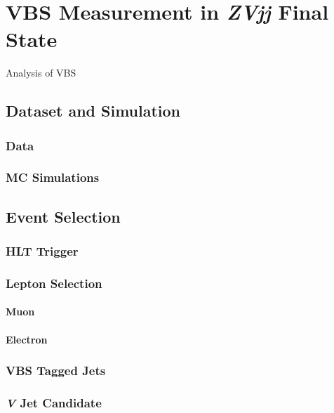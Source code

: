 \chapter{
  VBS Measurement in \textit{ZVjj} Final State
 }\label{ch_vbs}

Analysis of \gls{VBS}

\section{
  Dataset and Simulation
 }

\subsection{
  Data
}

\subsection{
  \gls{MC} Simulations
}

\section{
  Event Selection
 }

\subsection{
  HLT Trigger
}

\subsection{
  Lepton Selection
}

\subsubsection{
  Muon
}

\subsubsection{
  Electron
}

\subsection{
  \gls{VBS} Tagged Jets
}

\subsection{
  \textit{V} Jet Candidate
}
